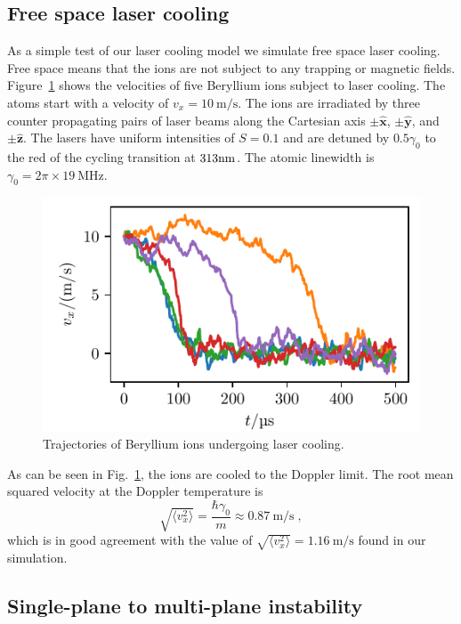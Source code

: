 \documentclass[aps, pra, twocolumn]{revtex4-1}
\begin{document}
\subsection{Free space laser cooling}

As a simple test of our laser cooling model we simulate free
space laser cooling. Free space means that the ions are not
subject to any trapping or magnetic fields.
Figure~\ref{fig:FreeSpaceCooling} shows the velocities of five
Beryllium ions subject to laser cooling. The atoms start with a
velocity of $v_x=\SI{10}{\meter/\second}$. The ions are
irradiated by three counter propagating pairs of laser beams
along the Cartesian axis $\pm\hat{\mathbf{x}}$,
$\pm\hat{\mathbf{y}}$, and $\pm\hat{\mathbf{z}}$. The lasers have
uniform intensities of $S=0.1$ and are detuned by $0.5\gamma_0$
to the red of the cycling transition at $313{\rm nm}$. The atomic
linewidth is $\gamma_0=2\pi\times \SI{19}{\mega\hertz}$.

\begin{figure}
  \includegraphics{./figures/fig_laser_cooling.pdf}
  \caption{Trajectories of Beryllium ions undergoing laser
    cooling.}
  \label{fig:FreeSpaceCooling}
\end{figure}
As can be seen in Fig.~\ref{fig:FreeSpaceCooling}, the ions are
cooled to the Doppler limit. The root mean squared velocity at the Doppler
temperature is
\begin{equation}
\sqrt{\langle v_x^2\rangle} = \frac{\hbar \gamma_0}{m} \approx
\SI{0.87}{\meter/\second}\;,
\end{equation}
which is in good agreement with the value of $\sqrt{\langle
  v_x^2\rangle}=\SI{1.16}{\meter/\second}$ found in our
simulation.


\subsection{Single-plane to multi-plane instability}
\label{sec:validation}
\end{document}
